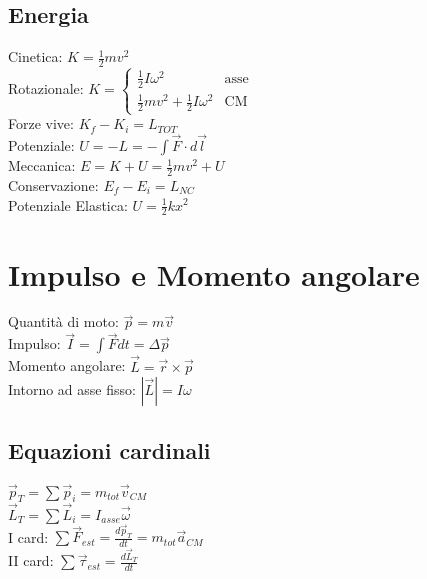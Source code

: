 \documentclass[8pt]{scrreprt}
\begin{document}
\begin{multicols*}{3}
\subsection*{Energia}
Cinetica: $K = \frac{1}{2}mv^2$\\
Rotazionale: $K = \left\{ \begin{array}{ll} \frac{1}{2}I\omega^2 & \text{asse} \\ \frac{1}{2}mv^2 + \frac{1}{2}I\omega^2 & \text{CM} \end{array} \right.$\\
Forze vive: $K_f - K_i = L_{TOT}$\\
Potenziale: $U = -L = -\int \overrightarrow{F} \cdot d\overrightarrow{l}$\\
Meccanica: $E = K + U = \frac{1}{2}mv^2 + U$\\
Conservazione: $E_f - E_i = L_{NC}$\\
Potenziale Elastica: $U = \frac{1}{2}kx^2$

\vspace{-3mm}
\section*{Impulso e Momento angolare}
Quantit\`a di moto: $\overrightarrow{p} = m\overrightarrow{v}$\\
Impulso: $\overrightarrow{I} = \int \overrightarrow{F} dt = \Delta \overrightarrow{p}$\\
Momento angolare: $\overrightarrow{L} = \overrightarrow{r} \times \overrightarrow{p}$\\
Intorno ad asse fisso: $ |\overrightarrow{L}| = I \omega$

\vspace{-3mm}
\subsection*{Equazioni cardinali}
$\overrightarrow{p}_T = \sum \overrightarrow{p}_i = m_{tot} \overrightarrow{v}_{CM}$\\
$\overrightarrow{L}_T = \sum \overrightarrow{L}_i = I_{asse} \overrightarrow{\omega}$\\
I card: $\sum \overrightarrow{F}_{est} = \frac{d\overrightarrow{p}_T}{dt} = m_{tot} \overrightarrow{a}_{CM}$\\
II card: $\sum \overrightarrow{\tau}_{est} = \frac{d\overrightarrow{L}_T}{dt}$

\vspace{-3mm}

\end{multicols*}
\end{document}
